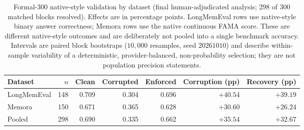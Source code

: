 \begin{table}[t]
\centering
\small
\caption{Formal-300 native-style validation by dataset (final
human-adjudicated analysis; 298 of 300 matched blocks resolved). Effects are
in percentage points. LongMemEval rows use native-style binary answer
correctness; Memora rows use the native continuous FAMA score. These are
different native-style outcomes and are deliberately not pooled into a single
benchmark accuracy. Intervals are paired block bootstraps ($10{,}000$
resamples, seed $20261010$) and describe within-sample variability of a
deterministic, provider-balanced, non-probability selection; they are not
population precision statements.}
\label{tab:formal300-source}
\begin{tabular}{lrrrrrr}
\toprule
Dataset & $n$ & Clean & Corrupted & Enforced & Corruption (pp) & Recovery (pp) \\
\midrule
LongMemEval & 148 & 0.709 & 0.304 & 0.696 & $+40.54$ & $+39.19$ \\
Memora & 150 & 0.671 & 0.365 & 0.628 & $+30.60$ & $+26.24$ \\
\midrule
Pooled & 298 & 0.690 & 0.335 & 0.662 & $+35.54$ & $+32.67$ \\
\bottomrule
\end{tabular}
\end{table}

